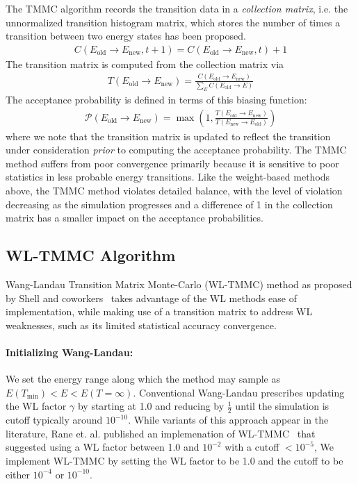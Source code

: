 \documentclass[letterpaper,twocolumn,amsmath,amssymb,pre,aps,10pt]{revtex4-1}
\begin{document}
The TMMC algorithm records the transition data in a \emph{collection matrix},
i.e. the unnormalized transition histogram matrix, which stores the number
of times a transition between two energy states has been proposed.
\begin{align}
  C(E_{\text{old}} \rightarrow E_{\text{new}},t+1)
     = C(E_{\text{old}} \rightarrow E_{\text{new}},t) + 1
\end{align}
The transition matrix is computed from the collection matrix via
\begin{align}
  T(E_{\text{old}} \rightarrow E_{\text{new}})
   = \frac{C(E_{\text{old}} \rightarrow E_{\text{new}})}{
     \sum_E C(E_{\text{old}} \rightarrow E)
  }
\end{align}
The acceptance probability is defined in terms of this biasing function:
\begin{align}
  \mathcal{P}(E_{\text{old}} \rightarrow E_{\text{new}}) =
  \max\left(1,\frac{T(E_{\text{old}} \rightarrow E_{\text{new}})}{
       T(E_{\text{new}} \rightarrow E_{\text{old}})}\right)
\end{align}
where we note that the transition matrix is updated to reflect the
transition under consideration \emph{prior} to computing the acceptance
probability.  The TMMC method suffers from poor convergence primarily
because it is sensitive to poor statistics in less probable energy
transitions.  Like the weight-based methods above, the TMMC method violates
detailed balance, with the level of violation decreasing as the simulation
progresses and a difference of 1 in the collection matrix has a smaller
impact on the acceptance probabilities.

\subsection{WL-TMMC Algorithm}
Wang-Landau Transition Matrix Monte-Carlo (WL-TMMC) method as proposed
by Shell and coworkers~\cite{shell2003improved,shell2004flat} takes
advantage of the WL methods ease of implementation, while making use of
a transition matrix to address WL weaknesses, such as its limited
statistical accuracy convergence.

\paragraph{Initializing Wang-Landau:}
We set the energy range along which the method may sample as
$E(T_{\min}) <E< E(T=\infty)$. Conventional Wang-Landau prescribes
updating the WL factor $\gamma$ by starting at 1.0 and reducing by
$\frac12$ until the simulation is cutoff typically around $10^{-10}$.
While variants of this approach appear in the literature, Rane et. al.
published an implemenation of WL-TMMC~\cite{rane2013monte} that
suggested using a WL factor between 1.0 and $10^{-2}$ with a cutoff
$<10^{-5}$, We implement WL-TMMC by setting the WL factor to be 1.0 and
the cutoff to be either $10^{-4}$ or $10^{-10}$.
\end{document}

